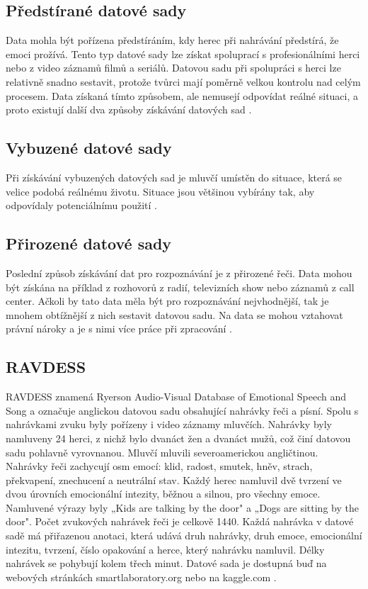 \documentclass[FM,BP]{tulthesis}
\begin{document}
\subsection{Předstírané datové sady} %
Data mohla být pořízena předstíráním, kdy herec při nahrávání předstírá, že emoci prožívá. Tento typ datové sady lze získat spoluprací s profesionálními herci nebo z video záznamů filmů a seriálů. Datovou sadu při spolupráci s herci lze relativně snadno sestavit, protože tvůrci mají poměrně velkou kontrolu nad celým procesem. Data získaná tímto způsobem, ale nemusejí odpovídat reálné situaci, a proto existují další dva způsoby získávání datových sad \cite{konar_chakraborty_2015}.

\subsection{Vybuzené datové sady} %
Při získávání vybuzených datových sad je mluvčí umístěn do situace, která se velice podobá reálnému životu. Situace jsou většinou vybírány tak, aby odpovídaly potenciálnímu použití \cite{konar_chakraborty_2015}.

\subsection{Přirozené datové sady} %
Poslední způsob získávání dat pro rozpoznávání je z přirozené řeči. Data mohou být získána na příklad z rozhovorů z radií, televizních show nebo záznamů z call center. Ačkoli by tato data měla být pro rozpoznávání nejvhodnější, tak je mnohem obtížnější z nich sestavit datovou sadu. Na data se mohou vztahovat právní nároky a je s nimi více práce při zpracování \cite{DBLP:journals/speech/AkcayO20}.

\subsection{RAVDESS} %
RAVDESS \cite{Livingstone2018} znamená Ryerson Audio-Visual Database of Emotional Speech and Song a označuje anglickou datovou sadu obsahující nahrávky řeči a písní. Spolu s nahrávkami zvuku byly pořízeny i video záznamy mluvčích. Nahrávky byly namluveny 24 herci, z nichž bylo dvanáct žen a dvanáct mužů, což činí datovou sadu pohlavně vyrovnanou. Mluvčí mluvili severoamerickou angličtinou. Nahrávky řeči zachycují osm emocí: klid, radost, smutek, hněv, strach, překvapení, znechucení a neutrální stav. Každý herec namluvil dvě tvrzení ve dvou úrovních emocionální intezity, běžnou a silnou, pro všechny emoce. Namluvené výrazy byly „Kids are talking by the door" a „Dogs are sitting by the door". Počet zvukových nahrávek řeči je celkově 1440. Každá nahrávka v datové sadě má přiřazenou anotaci, která udává druh nahrávky, druh emoce, emocionální intezitu, tvrzení, číslo opakování a herce, který nahrávku namluvil. Délky nahrávek se pohybují kolem třech minut. Datové sada je dostupná buď na webových stránkách smartlaboratory.org nebo na kaggle.com \cite{smart_lab}.
\end{document}
